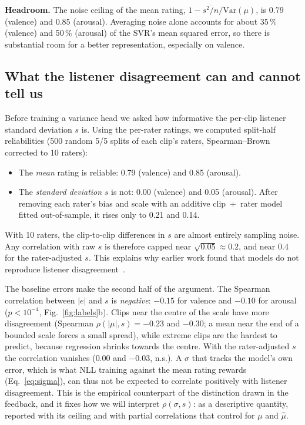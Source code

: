 \documentclass[conference]{IEEEtran}
\begin{document}
\textbf{Headroom.} The noise ceiling of the mean rating,
$1-\overline{s^2/n}/\mathrm{Var}(\mu)$, is $0.79$ (valence) and $0.85$
(arousal). Averaging noise alone accounts for about 35\,\% (valence) and
50\,\% (arousal) of the SVR's mean squared error, so there is substantial room
for a better representation, especially on valence.

\subsection{What the listener disagreement can and cannot tell us}
\label{sec:res-disagreement}
Before training a variance head we asked how informative the per-clip listener
standard deviation $s$ is. Using the per-rater ratings, we computed
split-half reliabilities (500 random 5/5 splits of each clip's raters,
Spearman--Brown corrected to 10 raters):
\begin{itemize}
\item The \emph{mean} rating is reliable: 0.79 (valence) and 0.85 (arousal).
\item The \emph{standard deviation} $s$ is not: 0.00 (valence) and 0.05
(arousal). After removing each rater's bias and scale with an additive
clip~+~rater model fitted out-of-sample, it rises only to 0.21 and 0.14.
\end{itemize}
With 10 raters, the clip-to-clip differences in $s$ are almost entirely
sampling noise. Any correlation with raw $s$ is therefore capped near
$\sqrt{0.05}\approx0.2$, and near $0.4$ for the rater-adjusted $s$. This
explains why earlier work found that models do not reproduce listener
disagreement~\cite{watcharasupat2025}.

The baseline errors make the second half of the argument. The Spearman
correlation between $|e|$ and $s$ is \emph{negative}: $-0.15$ for valence and
$-0.10$ for arousal ($p<10^{-4}$, Fig.~\ref{fig:labels}b). Clips near the
centre of the scale have more disagreement (Spearman $\rho(|\mu|,s)=-0.23$ and
$-0.30$; a mean near the end of a bounded scale forces a small spread), while
extreme clips are the hardest to predict, because regression shrinks towards
the centre. With the rater-adjusted $s$ the correlation vanishes ($0.00$ and
$-0.03$, n.s.). A $\sigma$ that tracks the model's own error, which is what
NLL training against the mean rating rewards (Eq.~\ref{eq:sigma}), can thus
not be expected to correlate positively with listener disagreement. This is
the empirical counterpart of the distinction drawn in the feedback, and it
fixes how we will interpret $\rho(\sigma, s)$: as a descriptive quantity,
reported with its ceiling and with partial correlations that control for
$\mu$ and $\hat\mu$.
\end{document}
